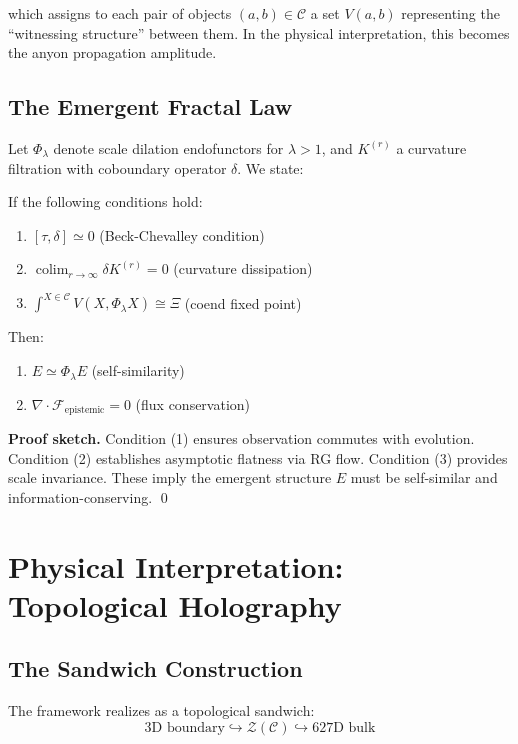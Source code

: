 \documentclass[11pt]{article}
\begin{document}
which assigns to each pair of objects $(a,b) \in \mathcal{C}$ a set $V(a,b)$ representing the ``witnessing structure'' between them. In the physical interpretation, this becomes the anyon propagation amplitude.

\subsection{The Emergent Fractal Law}

Let $\Phi_\lambda$ denote scale dilation endofunctors for $\lambda > 1$, and $K^{(r)}$ a curvature filtration with coboundary operator $\delta$. We state:

\begin{theorem}
If the following conditions hold:
\begin{enumerate}
\item $[\tau, \delta] \simeq 0$ (Beck-Chevalley condition)
\item $\displaystyle\operatorname*{colim}_{r \to \infty} \delta K^{(r)} = 0$ (curvature dissipation)
\item $\displaystyle\int^{X \in \mathcal{C}} V(X, \Phi_\lambda X) \cong \Xi$ (coend fixed point)
\end{enumerate}
Then:
\begin{enumerate}
\item $E \simeq \Phi_\lambda E$ (self-similarity)
\item $\nabla \cdot \mathcal{F}_{\text{epistemic}} = 0$ (flux conservation)
\end{enumerate}
\end{theorem}

\noindent\textbf{Proof sketch.} Condition (1) ensures observation commutes with evolution. Condition (2) establishes asymptotic flatness via RG flow. Condition (3) provides scale invariance. These imply the emergent structure $E$ must be self-similar and information-conserving. \qed

\section{Physical Interpretation: Topological Holography}

\subsection{The Sandwich Construction}

The framework realizes as a topological sandwich:
\begin{equation}
\text{3D boundary} \hookrightarrow \mathcal{Z}(\mathcal{C}) \hookrightarrow \text{627D bulk}
\end{equation}
\end{document}
